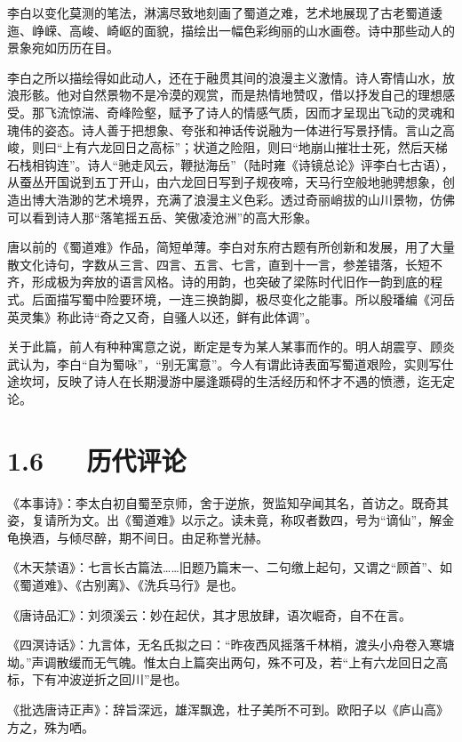 \documentclass[letterpaper,12pt,english]{sphinxmanual}
\begin{document}
李白以变化莫测的笔法，淋漓尽致地刻画了蜀道之难，艺术地展现了古老蜀道逶迤、峥嵘、高峻、崎岖的面貌，描绘出一幅色彩绚丽的山水画卷。诗中那些动人的景象宛如历历在目。

李白之所以描绘得如此动人，还在于融贯其间的浪漫主义激情。诗人寄情山水，放浪形骸。他对自然景物不是冷漠的观赏，而是热情地赞叹，借以抒发自己的理想感受。那飞流惊湍、奇峰险壑，赋予了诗人的情感气质，因而才呈现出飞动的灵魂和瑰伟的姿态。诗人善于把想象、夸张和神话传说融为一体进行写景抒情。言山之高峻，则曰“上有六龙回日之高标”；状道之险阻，则曰“地崩山摧壮士死，然后天梯石栈相钩连”。诗人“驰走风云，鞭挞海岳”（陆时雍《诗镜总论》评李白七古语），从蚕丛开国说到五丁开山，由六龙回日写到子规夜啼，天马行空般地驰骋想象，创造出博大浩渺的艺术境界，充满了浪漫主义色彩。透过奇丽峭拔的山川景物，仿佛可以看到诗人那“落笔摇五岳、笑傲凌沧洲”的高大形象。

唐以前的《蜀道难》作品，简短单薄。李白对东府古题有所创新和发展，用了大量散文化诗句，字数从三言、四言、五言、七言，直到十一言，参差错落，长短不齐，形成极为奔放的语言风格。诗的用韵，也突破了梁陈时代旧作一韵到底的程式。后面描写蜀中险要环境，一连三换韵脚，极尽变化之能事。所以殷璠编《河岳英灵集》称此诗“奇之又奇，自骚人以还，鲜有此体调”。

关于此篇，前人有种种寓意之说，断定是专为某人某事而作的。明人胡震亨、顾炎武认为，李白“自为蜀咏”，“别无寓意”。今人有谓此诗表面写蜀道艰险，实则写仕途坎坷，反映了诗人在长期漫游中屡逢踬碍的生活经历和怀才不遇的愤懑，迄无定论。


\section{1.6   历代评论}
\label{\detokenize{p01_u6563_u6587/_u674e_u767d-_u8700_u9053_u96be:id8}}
《本事诗》：李太白初自蜀至京师，舍于逆旅，贺监知孕闻其名，首访之。既奇其姿，复请所为文。出《蜀道难》以示之。读未竟，称叹者数四，号为“谪仙”，解金龟换酒，与倾尽醉，期不间日。由足称誉光赫。

《木天禁语》：七言长古篇法……旧题乃篇末一、二句缴上起句，又谓之“顾首”、如《蜀道难》、《古别离》、《洗兵马行》是也。

《唐诗品汇》：刘须溪云：妙在起伏，其才思放肆，语次崛奇，自不在言。

《四溟诗话》：九言体，无名氏拟之曰：“昨夜西风摇落千林梢，渡头小舟卷入寒塘坳。”声调散缓而无气魄。惟太白上篇突出两句，殊不可及，若“上有六龙回日之高标，下有冲波逆折之回川”是也。

《批选唐诗正声》：辞旨深远，雄浑飘逸，杜子美所不可到。欧阳子以《庐山高》方之，殊为哂。
\end{document}
